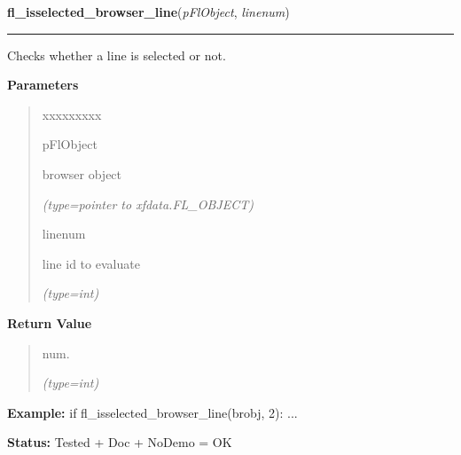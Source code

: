 \hspace{.8\funcindent}\begin{boxedminipage}{\funcwidth}

    \raggedright \textbf{fl\_isselected\_browser\_line}(\textit{pFlObject}, \textit{linenum})

    \vspace{-1.5ex}

    \rule{\textwidth}{0.5\fboxrule}
\setlength{\parskip}{2ex}
    Checks whether a line is selected or not.

\setlength{\parskip}{1ex}
      \textbf{Parameters}
      \vspace{-1ex}

      \begin{quote}
        \begin{Ventry}{xxxxxxxxx}

          \item[pFlObject]

          browser object

            {\it (type=pointer to xfdata.FL\_OBJECT)}

          \item[linenum]

          line id to evaluate

            {\it (type=int)}

        \end{Ventry}

      \end{quote}

      \textbf{Return Value}
    \vspace{-1ex}

      \begin{quote}
      num.

      {\it (type=int)}

      \end{quote}

\textbf{Example:} if fl\_isselected\_browser\_line(brobj, 2): ...



\textbf{Status:} Tested + Doc + NoDemo = OK



    \end{boxedminipage}

    \label{xformslib:flbrowser:fl_get_browser_topline}

